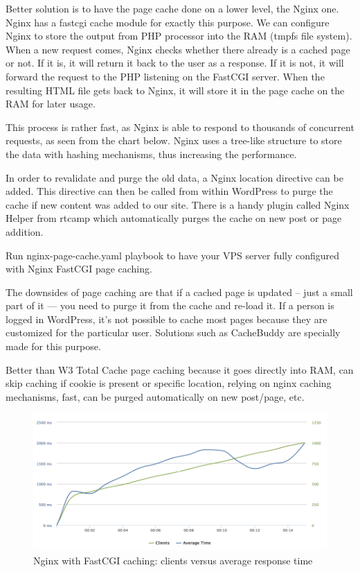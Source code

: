 Better solution is to have the page cache done on a lower level, the Nginx one. Nginx has a fastcgi cache module for exactly this purpose. We can configure Nginx to store the output from PHP processor into the RAM (tmpfs file system). When a new request comes, Nginx checks whether there already is a cached page or not. If it is, it will return it back to the user as a response. If it is not, it will forward the request to the PHP listening on the FastCGI server. When the resulting HTML file gets back to Nginx, it will store it in the page cache on the RAM for later usage.

This process is rather fast, as Nginx is able to respond to thousands of concurrent requests, as seen from the chart below. Nginx uses a tree-like structure to store the data with hashing mechanisms, thus increasing the performance.

In order to revalidate and purge the old data, a Nginx location directive can be added. This directive can then be called from within WordPress to purge the cache if new content was added to our site. There is a handy plugin called Nginx Helper from rtcamp which automatically purges the cache on new post or page addition.

Run nginx-page-cache.yaml playbook to have your VPS server fully configured with Nginx FastCGI page caching.

The downsides of page caching are that if a cached page is updated – just a small part of it — you need to purge it from the cache and re-load it. If a person is logged in WordPress, it's not possible to cache most pages because they are customized for the particular user. Solutions such as CacheBuddy are specially made for this purpose.

Better than W3 Total Cache page caching because it goes directly into RAM, can skip caching if cookie is present or specific location, relying on nginx caching mechanisms, fast, can be purged automatically on new post/page, etc.

\begin{figure}[H]
\begin{center}
\includegraphics[scale=0.5]{figures/Nginx_FastCGI_caching.png}
\caption{Nginx with FastCGI caching: clients versus average response time}
\label{fig:nginx_fastcgi_caching}
\end{center}
\end{figure}


